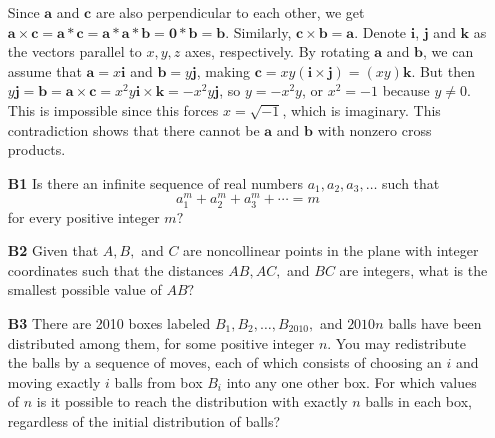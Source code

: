 \documentclass[11pt,a4paper]{article}
\newcommand{\<}{\langle}
\renewcommand{\>}{\rangle}
\begin{document}
\begin{enumerate}
	Since $\mathbf{a}$ and $\mathbf{c}$ are also perpendicular to each other, we get $\mathbf{a}\times \mathbf{c}=\mathbf{a} * \mathbf{c}=\mathbf{a} * \mathbf{a} * \mathbf{b}=\mathbf{0} * \mathbf{b}=\mathbf{b}$. Similarly, $\mathbf{c}\times \mathbf{b}=\mathbf{a}$. Denote $\mathbf{i}$, $\mathbf{j}$ and $\mathbf{k}$ as the vectors parallel to $x, y, z$ axes, respectively. By rotating $\mathbf{a}$ and $\mathbf{b}$, we can assume that $\mathbf{a}=x\mathbf{i}$ and $\mathbf{b}=y\mathbf{j}$, making $\mathbf{c}=xy(\mathbf{i}\times \mathbf{j})=(xy)\mathbf{k}$. 
	But then $y\mathbf{j}=\mathbf{b}=\mathbf{a}\times\mathbf{c}=x^2y\mathbf{i}\times\mathbf{k}=- x^2y\mathbf{j}$, so $y=-x^2y$, or $x^2=-1$ because $y\neq 0$. This is impossible since this forces $x=\sqrt{-1}$, which is imaginary. This contradiction shows that there cannot be $\mathbf{a}$ and $\mathbf{b}$ with nonzero cross products. 
	
	\item [\textbf{B1}]
	Is there an infinite sequence of real numbers $a_1,a_2,a_3,\dots$ such that
	\[a_1^m+a_2^m+a_3^m+\cdots=m\]
	for every positive integer $m?$
	
	\item [\textbf{B2}]
	Given that $A,B,$ and $C$ are noncollinear points in the plane with integer coordinates such that the distances $AB,AC,$ and $BC$ are integers, what is the smallest possible value of $AB?$
	
	\item [\textbf{B3}]
	There are 2010 boxes labeled $B_1,B_2,\dots,B_{2010},$ and $2010n$ balls have been distributed among them, for some positive integer $n.$ You may redistribute the balls by a sequence of moves, each of which consists of choosing an $i$ and moving exactly $i$ balls from box $B_i$ into any one other box. For which values of $n$ is it possible to reach the distribution with exactly $n$ balls in each box, regardless of the initial distribution of balls?
\end{enumerate}
\end{document}
